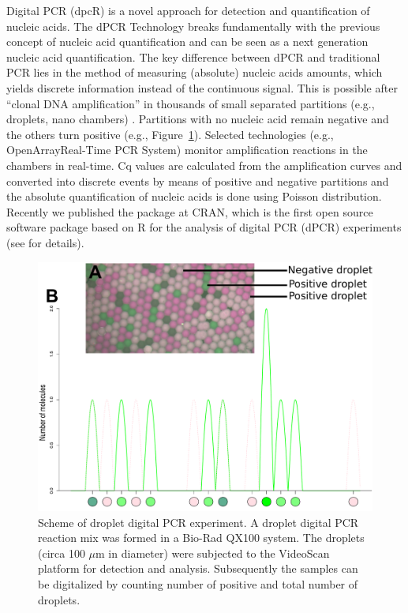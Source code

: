 Digital PCR (dpcR) is a novel approach for detection and quantification of 
nucleic acids. The dPCR Technology breaks fundamentally with the previous 
concept of nucleic acid quantification and can be seen as a next generation 
nucleic acid quantification. The key difference between dPCR and traditional 
PCR lies in the method of measuring (absolute) nucleic acids amounts, which 
yields discrete information instead of the continuous signal. This is possible 
after ``clonal DNA amplification'' in thousands of small separated partitions 
(e.g., droplets, nano chambers) \citep{huggett_2013, milbury_2014, 
morley_2014}. Partitions with no nucleic acid remain negative and the others 
turn positive (e.g., Figure~\ref{figure:dpcR_sim}). Selected technologies 
(e.g., OpenArray\textregistered Real-Time PCR System) monitor amplification 
reactions in the chambers in real-time. Cq values are calculated from the 
amplification curves and converted into discrete events by means of positive and 
negative partitions and the absolute quantification of nucleic acids is done 
using Poisson distribution. Recently we published the  package at 
CRAN, which is the first open source software package based on R for the 
analysis of digital PCR (dPCR) experiments (see  for details).

\begin{figure}[htbp]
  \centering
  \includegraphics[clip=true, width=14cm]{figures/dpcR_sim.pdf}
  \caption{Scheme of droplet digital PCR experiment.  A droplet 
digital PCR reaction mix was formed in a Bio-Rad QX100 system. The droplets 
(circa 100 $\mu$m in diameter) were subjected to the VideoScan platform for 
detection and analysis.  Subsequently the samples can be 
digitalized 
by counting number of positive and total number of droplets.}
\label{figure:dpcR_sim}
\end{figure}

